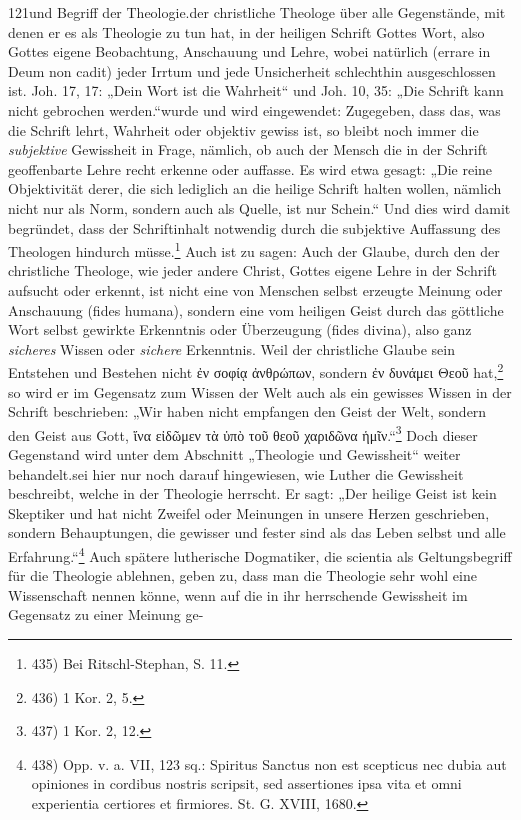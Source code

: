 \hfill 121\n\nWesen und Begriff der Theologie.\n\nhat der christliche Theologe über alle Gegenstände, mit denen er es als Theologie zu tun hat, in der heiligen Schrift Gottes Wort, also Gottes eigene Beobachtung, Anschauung und Lehre, wobei natürlich (errare in Deum non cadit) jeder Irrtum und jede Unsicherheit schlechthin ausgeschlossen ist. Joh. 17, 17: „Dein Wort ist die Wahrheit“ und Joh. 10, 35: „Die Schrift kann nicht gebrochen werden.“\n\nDagegen wurde und wird eingewendet: Zugegeben, dass das, was die Schrift lehrt, Wahrheit oder objektiv gewiss ist, so bleibt noch immer die \emph{subjektive} Gewissheit in Frage, nämlich, ob auch der Mensch die in der Schrift geoffenbarte Lehre recht erkenne oder auffasse. Es wird etwa gesagt: „Die reine Objektivität derer, die sich lediglich an die heilige Schrift halten wollen, nämlich nicht nur als Norm, sondern auch als Quelle, ist nur Schein.“ Und dies wird damit begründet, dass der Schriftinhalt notwendig durch die subjektive Auffassung des Theologen hindurch müsse.\footnote{435) Bei Ritschl-Stephan, S. 11.} Auch ist zu sagen: Auch der Glaube, durch den der christliche Theologe, wie jeder andere Christ, Gottes eigene Lehre in der Schrift aufsucht oder erkennt, ist nicht eine von Menschen selbst erzeugte Meinung oder Anschauung (fides humana), sondern eine vom heiligen Geist durch das göttliche Wort selbst gewirkte Erkenntnis oder Überzeugung (fides divina), also ganz \emph{sicheres} Wissen oder \emph{sichere} Erkenntnis. Weil der christliche Glaube sein Entstehen und Bestehen nicht \textgreek{ἐν σοφίᾳ ἀνθρώπων}, sondern \textgreek{ἐν δυνάμει Θεοῦ} hat,\footnote{436) 1 Kor. 2, 5.} so wird er im Gegensatz zum Wissen der Welt auch als ein gewisses Wissen in der Schrift beschrieben: „Wir haben nicht empfangen den Geist der Welt, sondern den Geist aus Gott, \textgreek{ἵνα εἰδῶμεν τὰ ὑπὸ τοῦ θεοῦ χαριδῶνα ἡμῖν}.“\footnote{437) 1 Kor. 2, 12.} Doch dieser Gegenstand wird unter dem Abschnitt „Theologie und Gewissheit“ weiter behandelt.\n\nEs sei hier nur noch darauf hingewiesen, wie Luther die Gewissheit beschreibt, welche in der Theologie herrscht. Er sagt: „Der heilige Geist ist kein Skeptiker und hat nicht Zweifel oder Meinungen in unsere Herzen geschrieben, sondern Behauptungen, die gewisser und fester sind als das Leben selbst und alle Erfahrung.“\footnote{438) Opp. v. a. VII, 123 sq.: Spiritus Sanctus non est scepticus nec dubia aut opiniones in cordibus nostris scripsit, sed assertiones ipsa vita et omni experientia certiores et firmiores. St. G. XVIII, 1680.} Auch spätere lutherische Dogmatiker, die scientia als Geltungsbegriff für die Theologie ablehnen, geben zu, dass man die Theologie sehr wohl eine Wissenschaft nennen könne, wenn auf die in ihr herrschende Gewissheit im Gegensatz zu einer Meinung ge-